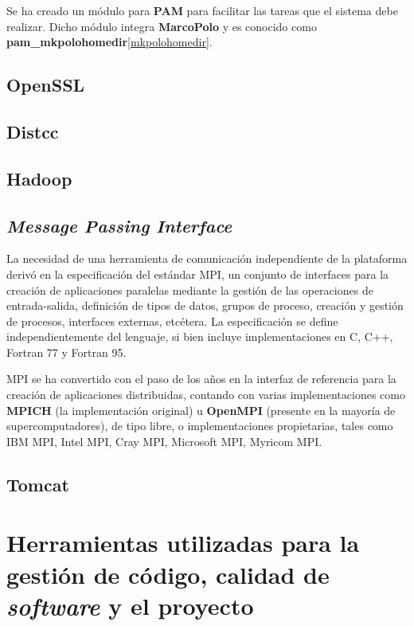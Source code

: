 Se ha creado un módulo para \textbf{PAM} para facilitar las tareas que el sistema debe realizar. Dicho módulo integra \textbf{MarcoPolo} y es conocido como \textbf{pam\_mkpolohomedir}\ref{mkpolohomedir}. 

\subsection{OpenSSL}

\subsection{Distcc}

\subsection{Hadoop}

\subsection{\textit{Message Passing Interface}}

La necesidad de una herramienta de comunicación independiente de la plataforma derivó en la especificación del estándar MPI\cite{MPISpec}, un conjunto de interfaces para la creación de aplicaciones paralelas mediante la gestión de las operaciones de entrada-salida, definición de tipos de datos, grupos de proceso, creación y gestión de procesos, interfaces externas, etcétera. La especificación se define independientemente del lenguaje, si bien incluye implementaciones en C, C++, Fortran 77 y Fortran 95.

MPI se ha convertido con el paso de los años en la interfaz de referencia para la creación de aplicaciones distribuidas, contando con varias implementaciones como \textbf{MPICH} (la implementación original) u \textbf{OpenMPI} (presente en la mayoría de supercomputadores), de tipo libre, o implementaciones propietarias, tales como IBM MPI, Intel MPI, Cray MPI, Microsoft MPI, Myricom MPI.

\subsection{Tomcat}

\section{Herramientas utilizadas para la gestión de código, calidad de \textit{software} y el proyecto}

